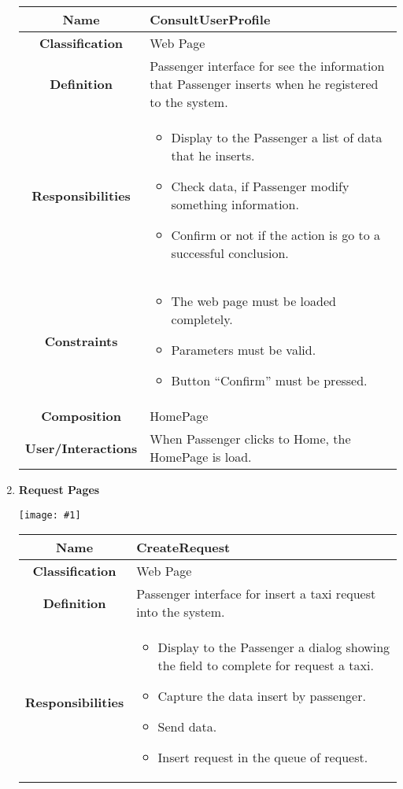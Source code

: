 \documentclass[11pt, a4paper,titlepage]{article}
\newcommand{\image}[1]{
	\begin{center}
		\noindent \texttt{[image: \#1]}
	\end{center}
	}
\begin{document}
\begin{enumerate}
\begin{tabularx}{\textwidth}{| c | X |}
	\hline
	\textbf{Name} & 
	ConsultUserProfile
	\\
	\hline
	\textbf{Classification} & 
	Web Page
	\\
	\hline
	\textbf{Definition} & 
	Passenger interface for see the information that Passenger inserts when he registered to the system.
	\\
	\hline
	\textbf{Responsibilities} &
	\begin{itemize}
		\item Display to the Passenger a list of data that he inserts.
		\item Check data, if Passenger modify something information.
		\item Confirm or not if the action is go to a successful conclusion.
	\end{itemize}
	\\
	\hline
	\textbf{Constraints} & 
	\begin{itemize}
		\item  The web page must be loaded completely.
		\item Parameters must be valid.
		\item Button “Confirm” must be pressed.
	\end{itemize}
	\\
	\hline
	\textbf{Composition} & 
	HomePage
	\\
	\hline
	\textbf{User/Interactions} & 
     When Passenger clicks to Home, the HomePage is load.    
	\\
	\hline	
\end{tabularx}	
\newpage
\item \textbf{Request Pages}\\
\image{page_request.png}
\begin{tabularx}{\textwidth}{| c | X |}
	\hline
	\textbf{Name} & 
	CreateRequest
	\\
	\hline
	\textbf{Classification} & 
	Web Page
	\\
	\hline
	\textbf{Definition} & 
	Passenger interface for insert a taxi request into the system.\\
	\hline
	\textbf{Responsibilities} &
	\begin{itemize}
		\item Display to the Passenger a dialog showing the field to     complete for request a taxi.
		\item  Capture the data insert by passenger.
		\item Send data.
		\item Insert request in the queue of request.

\end{itemize}
\end{tabularx}
\end{enumerate}
\end{document}
